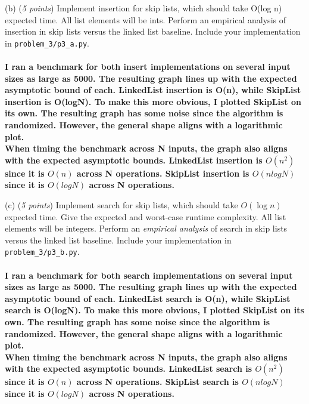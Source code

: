 \documentclass{hw_template}
\begin{document}
\begin{problem}
(b) (\textit{5 points})
Implement insertion for skip lists, which should take O(log n) expected time. All
list elements will be ints. Perform an empirical analysis of insertion in skip lists versus the
linked list baseline. Include your implementation in 
\texttt{problem\_3/p3\_a.py}.\\\\
\textbf{I ran a benchmark for both insert implementations on several input sizes as large as 5000. The resulting graph lines up with the 
expected asymptotic bound of each. LinkedList insertion is O(n), while SkipList insertion is O(logN). To make this more obvious, I plotted SkipList
on its own. The resulting graph has some noise since the algorithm is randomized. However, the general shape aligns with a logarithmic plot.}\\
\textbf{When timing the benchmark across N inputs, the graph also aligns with the expected asymptotic bounds.
LinkedList insertion is $O(n^2)$ since it is $O(n)$ across N operations.
SkipList insertion is $O(nlogN)$ since it is $O(logN)$ across N operations.}\\

\newpage

(c) (\textit{5 points})
Implement search for skip lists, which should take $O(\log n)$ expected time. Give
the expected and worst-case runtime complexity. All list elements will be integers. Perform
an \emph{empirical analysis} of search in skip lists versus the linked list baseline. Include your
implementation in \texttt{problem\_3/p3\_b.py}.\\\\
\textbf{I ran a benchmark for both search implementations on several input sizes as large as 5000. The resulting graph lines up with the 
expected asymptotic bound of each. LinkedList search is O(n), while SkipList search is O(logN). To make this more obvious, I plotted SkipList
on its own. The resulting graph has some noise since the algorithm is randomized. However, the general shape aligns with a logarithmic plot.}\\
\textbf{When timing the benchmark across N inputs, the graph also aligns with the expected asymptotic bounds.
LinkedList search is $O(n^2)$ since it is $O(n)$ across N operations.
SkipList search is $O(nlogN)$ since it is $O(logN)$ across N operations.}\\
\newpage


\end{problem}
\end{document}
